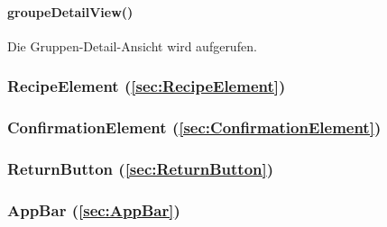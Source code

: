 \documentclass{entwurfsheft}
\begin{document}
\paragraph*{groupeDetailView()} Die Gruppen-Detail-Ansicht wird aufgerufen.

\subsubsection*{RecipeElement (\ref{sec:RecipeElement})}

\subsubsection*{ConfirmationElement (\ref{sec:ConfirmationElement})}

\subsubsection*{ReturnButton (\ref{sec:ReturnButton})}

\subsubsection*{AppBar (\ref{sec:AppBar})}
\end{document}
